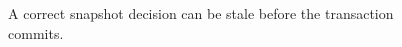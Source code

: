 \begin{figure}[H]
\centering
{}
\caption{A correct snapshot decision can be stale before the transaction commits.}\label{fig:teach-M07-13}
\end{figure}
